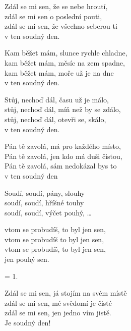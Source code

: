 
\ve{}
Zdál se mi sen, že se nebe hroutí,\\
zdál se mi sen o poslední pouti,\\
zdál se mi sen, že všechno seberou ti\\
v ten soudný den.

\ve{}
Kam běžet mám, slunce rychle chladne,\\
kam běžet mám, měsíc na zem spadne,\\
kam běžet mám, moře už je na dne\\
v ten soudný den.

\ve{}
Stůj, nechoď dál, času už je málo,\\
stůj, nechoď dál, míň než by se zdálo,\\
stůj, nechoď dál, otevři se, skálo,\\
v ten soudný den.

\ve{}
Pán tě zavolá, má pro každého místo,\\
Pán tě zavolá, jen kdo má duši čistou,\\
Pán tě zavolá, sám nedokázal bys to\\
v ten soudný den

\cho{}
Soudí, soudí, pány, slouhy\\
soudí, soudí, hříšné touhy\\
soudí, soudí, výčet pouhý, \ldots

\ve{}
vtom se probudíš, to byl jen sen,\\
vtom se probudíš to byl jen sen,\\
vtom se probudíš, to byl jen sen,\\
jen \quad {}pouhý sen.

\ve{}
= 1.

\ve{}
Zdál se mi sen, já stojím na svém místě\\
zdál se mi sen, mé svědomí je čisté\\
zdál se mi sen, jen jedno vím jistě.\\
Je \quad {}soudný den!

\esong
\restoregeometry{}